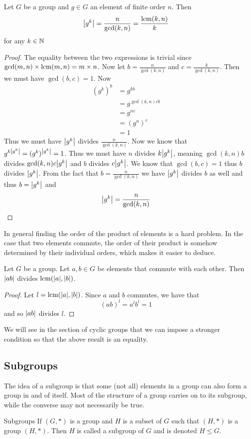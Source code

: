 \documentclass[a4paper]{article}
\begin{document}
\begin{prp}{}{} Let $G$ be a group and $g\in G$ an element of finite order $n$. Then $$\abs{g^k}=\frac{n}{\gcd(k,n)}=\frac{\operatorname{lcm}(k,n)}{k}$$ for any $k\in\mathbb{N}$\tcbline
\begin{proof} The equality between the two expressions is trivial since $\gcd(m,n)\times\operatorname{lcm}(m,n)=m\times n$. Now let $b=\frac{n}{\gcd(k,n)}$ and $c=\frac{k}{\gcd(k,n)}$. Then we must have $\gcd(b,c)=1$. Now
\begin{align*}
(g^k)^b&=g^{kb}\\
&=g^{\gcd(k,n)cb}\\
&=g^{nc}\\
&=(g^n)^c\\
&=1
\end{align*}
Thus we must have $\abs{g^k}$ divides $\frac{n}{\gcd(k,n)}$. Now we know that $g^{k\abs{g^k}}=(g^k)^{\abs{g^k}}=1$. Thus we must have $n$ divides $k\abs{g^k}$, meaning $\gcd(k,n)b$ divides $\gcd(k,n)c\abs{g^k}$ and $b$ divides $c\abs{g^k}$. We know that $\gcd(b,c)=1$ thus $b$ divides $\abs{g^k}$. From the fact that $b=\frac{n}{\gcd(k,n)}$ we have $\abs{g^k}$ divides $b$ as well and thus $b=\abs{g^k}$ and $$\abs{g^k}=\frac{n}{\gcd(k,n)}$$
\end{proof}
\end{prp}

In general finding the order of the product of elements is a hard problem. In the case that two elements commute, the order of their product is somehow determined by their individual orders, which makes it easier to deduce. 

\begin{lmm}{}{} Let $G$ be a group. Let $a,b\in G$ be elements that commute with each other. Then $\abs{ab}$ divides $\operatorname{lcm}(\abs{a},\abs{b})$. \tcbline
\begin{proof}
Let $l=\operatorname{lcm}(\abs{a},\abs{b})$. Since $a$ and $b$ commutes, we have that $$(ab)^l=a^lb^l=1$$ and so $\abs{ab}$ divides $l$. 
\end{proof}
\end{lmm}

We will see in the section of cyclic groups that we can impose a stronger condition so that the above result is an equality. 

\subsection{Subgroups}
The idea of a subgroup is that some (not all) elements in a group can also form a group in and of itself. Most of the structure of a group carries on to its subgroup, while the converse may not necessarily be true. 
\begin{defn}{Subgroups}{} If $(G,\ast)$ is a group and $H$ is a subset of $G$ such that $(H,\ast)$ is a group $(H,\ast)$. Then $H$ is called a subgroup of $G$ and is denoted $H\leq G$. 
\end{defn}
\end{document}
